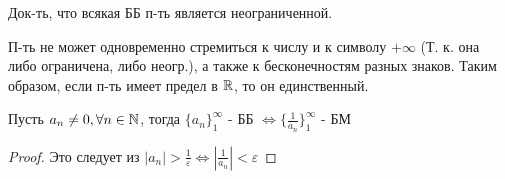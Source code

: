 \begin{task}
Док-ть, что всякая ББ п-ть является неограниченной.
\end{task}
\begin{note}
П-ть не может одновременно стремиться к числу и к символу $+\infty$ (Т. к. она либо ограничена, либо неогр.), а также к бесконечностям разных знаков. Таким образом, если п-ть имеет предел в $\mathbb{R}$, то он единственный.
\end{note}
\begin{lemma}
Пусть $a_n \neq 0, \forall n \in \mathbb{N}$, тогда $\{a_n\}_{1}^{\infty}$ - ББ $\iff \{\frac{1}{a_n}\}_{1}^{\infty}$ - БМ
\end{lemma}
\begin{proof}
Это следует из $\left|a_n\right| > \frac{1}{\varepsilon} \iff \left|\frac{1}{a_n}\right| < \varepsilon$
\end{proof}
